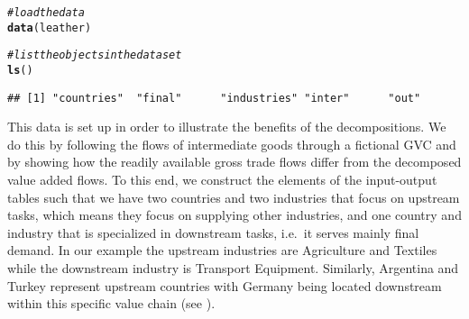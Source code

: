 \documentclass[a4paper]{article}\usepackage[]{graphicx}\usepackage[]{color}
\makeatletter
\newcommand{\hlcom}[1]{\textcolor[rgb]{0.678,0.584,0.686}{\textit{#1}}}%
\newcommand{\hlstd}[1]{\textcolor[rgb]{0.345,0.345,0.345}{#1}}%
\newcommand{\hlkwd}[1]{\textcolor[rgb]{0.737,0.353,0.396}{\textbf{#1}}}%
\newenvironment{kframe}{%
 \def\at@end@of@kframe{}%
 \ifinner\ifhmode%
  \def\at@end@of@kframe{\end{minipage}}%
  \begin{minipage}{\columnwidth}%
 \fi\fi%
 \def\FrameCommand##1{\hskip\@totalleftmargin \hskip-\fboxsep
 \colorbox{shadecolor}{##1}\hskip-\fboxsep
     \hskip-\linewidth \hskip-\@totalleftmargin \hskip\columnwidth}%
 \MakeFramed {\advance\hsize-\width
   \@totalleftmargin\z@ \linewidth\hsize
   \@setminipage}}%
 {\par\unskip\endMakeFramed%
 \at@end@of@kframe}
\newenvironment{knitrout}{}{} %
\makeatother
\begin{document}
\begin{knitrout}
\color{fgcolor}\begin{kframe}
\begin{alltt}
\hlcom{# load the data}
\hlkwd{data}\hlstd{(leather)}

\hlcom{# list the objects in the data set}
\hlkwd{ls}\hlstd{()}
\end{alltt}
\begin{verbatim}
## [1] "countries"  "final"      "industries" "inter"      "out"
\end{verbatim}
\end{kframe}
\end{knitrout}

This data is set up in order to illustrate the benefits of the decompositions.
We do this by following the flows of intermediate goods through a
fictional GVC and by showing how the readily available gross trade
flows differ from the decomposed value added flows. To this end, we
construct the elements of the input-output tables such that we have
two countries and two industries that focus on upstream tasks, which
means they focus on supplying other industries, and one country and
industry that is specialized in downstream tasks, i.e.~it serves
mainly final demand. In our example the upstream industries are Agriculture
and Textiles while the downstream industry is Transport Equipment.
Similarly, Argentina and Turkey represent upstream countries with
Germany being located downstream within this specific value chain
(see ).
\end{document}
